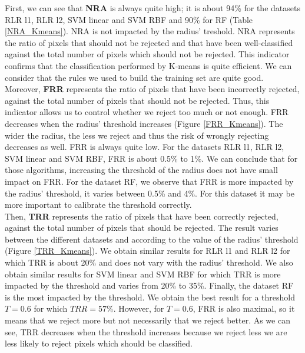 \documentclass{siamart171218}
\begin{document}
First, we can see that \textbf{NRA} is always quite high; it is about 94\% for the datasets RLR l1, RLR l2, SVM linear and SVM RBF and 90\% for RF (Table \ref{NRA_Kmeans}). NRA is not impacted by the radius' treshold. NRA represents the ratio of pixels that should not be rejected and that have been well-classified against the total number of pixels which should not be rejected. This indicator confirms that the classification performed by K-means is quite efficient. We can consider that the rules we used to build the training set are quite good. \\

Moreover, \textbf{FRR}  represents the ratio of pixels that have been incorrectly rejected, against the total number of pixels that should not be rejected. Thus, this indicator allows us to control whether we reject too much or not enough. FRR decreases when the radius' threshold increases (Figure \ref{FRR_Kmeans}). The wider the radius, the less we reject and thus the risk of wrongly rejecting decreases as well.  
FRR is always quite low. For the datasets RLR l1, RLR l2, SVM linear and SVM RBF, FRR is about 0.5\% to 1\%. We can conclude that for those algorithms, increasing the threshold of the radius does not have small impact on FRR. For the dataset RF, we observe that FRR is more impacted by the radius' threshold, it varies between 0.5\% and 4\%. For this dataset it may be more important to calibrate the threshold correctly. \\

Then, \textbf{TRR} represents the ratio of pixels that have been correctly rejected, against the total number of pixels that should be rejected. The result varies between the different datasets and according to the value of the radius' threshold (Figure \ref{TRR_Kmeans}). We obtain similar results for RLR l1 and RLR l2 for which TRR is about 20\% and does not vary with the radius' threshold. We also obtain similar results for SVM linear and SVM RBF for which TRR is more impacted by the threshold and varies from 20\% to 35\%. Finally, the dataset RF is the most impacted by the threshold. We obtain the best result for a threshold $T=0.6$ for which $TRR = 57\%$. However, for $T=0.6$, FRR is also maximal, so it means that we reject more but not necessarily that we reject better. As we can see, TRR decreases when the threshold increases because we reject less we are less likely to reject pixels which should be classified. \\
\end{document}
